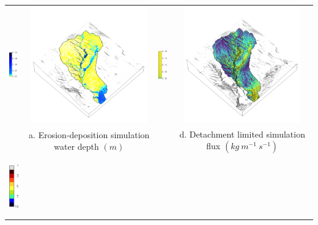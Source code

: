 \documentclass{standalone}
\begin{document}
\scriptsize
\centering 


\begin{tabular}{m{} m{} m{} m{}}
% 
\multicolumn{1}{c}{\includegraphics[height=25mm]{../../images/ss_erdep_3d/legend_depth.png}}
& \multicolumn{1}{c}{\includegraphics[height=50mm]{../../images/ss_erdep_3d/depth.png}} 
& \multicolumn{1}{c}{\includegraphics[height=25mm]{../../images/ss_flux_3d/legend_flux.png}}
& \multicolumn{1}{c}{\includegraphics[height=50mm]{../../images/ss_flux_3d/flux.png}}\\
\multicolumn{1}{c}{} 
& \multicolumn{1}{c}{a. Erosion-deposition simulation water depth $(m)$}
& \multicolumn{1}{c}{} 
& \multicolumn{1}{c}{d. Detachment limited simulation flux $(kg~m^{-1}~s^{-1})$}\\
%
\multicolumn{1}{c}{\includegraphics[height=25mm]{../../images/ss_erdep_3d/legend_landforms.png}}

\end{tabular}
\end{document}
